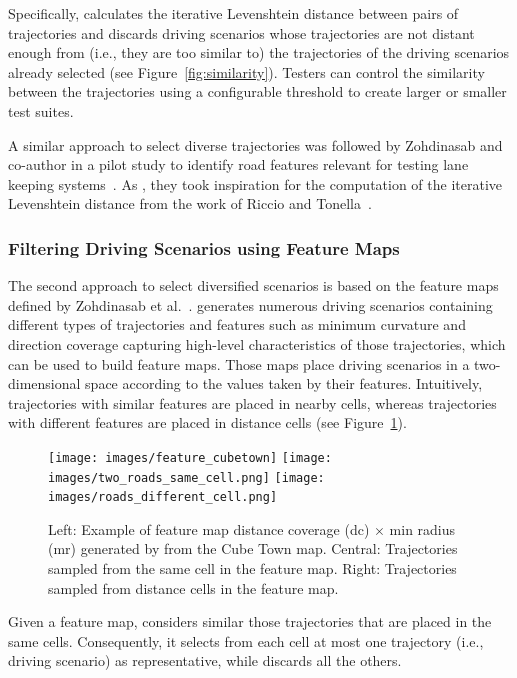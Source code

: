 \documentclass[conference]{IEEEtran}
\begin{document}
Specifically, \tool calculates the iterative Levenshtein distance between pairs of trajectories and discards driving scenarios whose trajectories are not distant enough from (i.e., they are too similar to) the trajectories of the driving scenarios already selected (see Figure~\ref{fig:similarity}).
%
Testers can control the similarity between the trajectories using a configurable threshold to create larger or smaller test suites. 


A similar approach to select diverse trajectories was followed by Zohdinasab and co-author in a pilot study to identify road features relevant for testing lane keeping systems~\cite{DBLP:conf/issta/ZohdinasabRGT21}.
As \tool, they took inspiration for the computation of the iterative Levenshtein distance from the work of Riccio and Tonella~\cite{DBLP:conf/sigsoft/RiccioT20}.

\subsubsection{Filtering Driving Scenarios using Feature Maps}
The second approach to select diversified scenarios is based on the feature maps defined by Zohdinasab et al.~\cite{DBLP:conf/issta/ZohdinasabRGT21}. 
%
\tool generates numerous driving scenarios containing different types of trajectories and features such as minimum curvature and direction coverage capturing high-level characteristics of those trajectories, which can be used to build feature maps. Those maps place driving scenarios in a two-dimensional space according to the values taken by their features.
%
Intuitively, trajectories with similar features are placed in nearby cells, whereas trajectories with different features are placed in distance cells (see Figure~\ref{fig:feature-maps}).

\begin{figure}[t]
\texttt{[image: images/feature\_cubetown]}
\endminipage\hfill
{}
\texttt{[image: images/two\_roads\_same\_cell.png]}
\endminipage\hfill
{}%
  \texttt{[image: images/roads\_different\_cell.png]}
\endminipage
\caption{Left: Example of feature map distance coverage (dc) $\times$ min radius (mr) generated by \tool from the Cube Town map. Central: Trajectories sampled from the same cell in the feature map. Right: Trajectories sampled from distance cells in the feature map.}
\label{fig:feature-maps}
\end{figure}

Given a feature map, \tool considers similar those trajectories that are placed in the same cells. Consequently, it selects from each cell at most one trajectory (i.e., driving scenario) as representative, while discards all the others.
\end{document}
